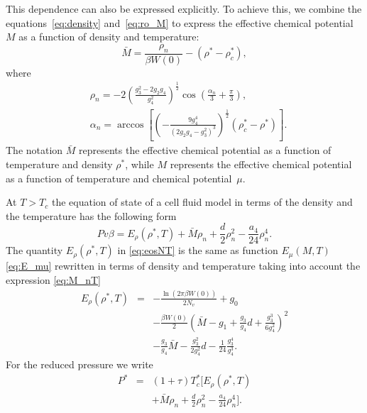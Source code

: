 \documentclass[fleqn,twoside,twocolumn,nofootinbib,showkeys]{revtex4} %
\begin{document}
	This dependence can also be expressed explicitly. To achieve this, we combine the equations~\eqref{eq:density} and~\eqref{eq:ro_M} to express the effective chemical potential $M$ as a function of density and temperature:
	\begin{equation}\label{eq:M_nT}
		\bar M = \frac{\rho_{n}}{\beta W(0)} - (\rho^* - \rho^*_c),
	\end{equation}
	where
	\begin{align} \label{eq:ro_nT}
		& \rho_{n} = - 2 \left(\frac{g_3^2 - 2g_2 g_4}{g_4^2} \right)^{\frac{1}{2}} \cos \left( \frac{\alpha_n}{3} + \frac{\pi}{3} \right), \\
		& \alpha_n = \arccos \left[ \left( - \frac{9 g_4^4}{\left( 2 g_2 g_4 - g_3^2\right)^3}\right)^{\frac{1}{2}} (\rho^*_c - \rho^*)\right]. \nonumber 
	\end{align}
	The notation $\bar{M}$ represents the effective chemical potential as a function of temperature and density $\rho^*$, while $M$ represents the effective chemical potential as a function of temperature and chemical potential~$\mu$.
	
	At $T>T_c$ the equation of state of a cell fluid model in terms of the density and the temperature has the following form
	\begin{equation}\label{eq:eosNT}
		Pv\beta = E_\rho (\rho^*,T) + \bar M \rho_{n} + \frac{d}{2} \rho_{n}^2 - \frac{a_4}{24} \rho_{n}^4.
	\end{equation}
	The quantity $E_\rho (\rho^*, T)$ in \eqref{eq:eosNT} is the same as function $E_\mu (M,T)$ \eqref{eq:E_mu} rewritten in terms of density and temperature taking into account the expression \eqref{eq:M_nT}
	\begin{eqnarray}\label{eq:E_nu}
		E_\rho (\rho^*, T) & = & - \frac{\ln (2\pi \beta W(0))}{2 N_v}  +  g_0 
		\nonumber\\
		&& - \frac{\beta W(0)}{2} 
		\left(\bar{M} - g_1 + \frac{g_3}{g_4} d + \frac{g_3^3}{6g_4^2} \right)^{2} 
		\nonumber\\
		&& - \frac{g_3}{g_4} {\bar{M}} - \frac{g_3^2}{2 g_4^2}  d - \frac{1}{24} \frac{g_3^4}{g_4^3}. 
	\end{eqnarray}
	For the reduced pressure we write
	\begin{eqnarray}
		\label{eq:eosPTn_reduced}
		P^* & = & (1 + \tau)T^*_c \bigg[ E_\rho (\rho^*,T) 
		\nonumber\\
		&& + \bar{M} \rho_{n} + \frac{d}{2} \rho_{n}^2 - \frac{a_4}{24} \rho_{n}^4\bigg].
	\end{eqnarray}
	
\end{document}
